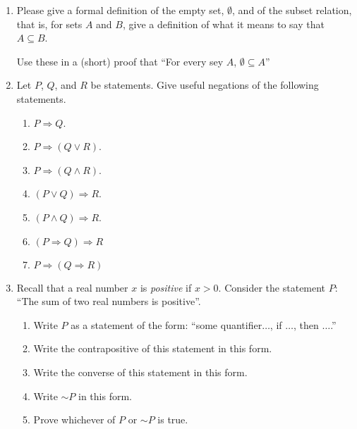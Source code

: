 \documentclass[12pt]{article}
\newcommand{\lsim}{\mathord{\sim}}  %
\newcommand{\demph}[1]{{\color{blue}\sl{#1}}}
\begin{document}
\begin{enumerate}
\item Please give a formal definition of the empty set, $\emptyset$, and of the subset relation, that is, for sets $A$ and $B$, give a
  definition of what it means to say that $A\subseteq B$.
  
      Use these in a (short) proof that ``For every sey $A$, $\emptyset\subseteq A$''

\item Let $P$, $Q$, and $R$ be statements.
      Give useful negations of the following statements.
     
\begin{enumerate}

  \item $P\Rightarrow Q$.

  \item  $P\Rightarrow(Q \vee R)$.

  \item  $P\Rightarrow(Q \wedge R)$.

  \item  $(P\vee Q)\Rightarrow R$.

  \item  $(P\wedge Q)\Rightarrow R$.

  \item  $(P\Rightarrow Q) \Rightarrow R$

  \item  $P\Rightarrow (Q \Rightarrow R)$

\end{enumerate}


\item  Recall that a real number $x$ is \demph{positive} if $x>0$.
     Consider the statement $P$: ``The sum of two real numbers is positive''.
  \begin{enumerate}
    \item Write $P$ as a statement of the form:
        ``some quantifier$\dotsc$, if $\dotsc$, then $\dotsc$.''
    \item Write the contrapositive of this statement in this form.
    \item Write the converse of this statement in this form.
    \item Write $\lsim P$ in this form.
    \item Prove whichever of $P$ or $\lsim P$ is true.
  \end{enumerate}



\end{enumerate}
\end{document}
